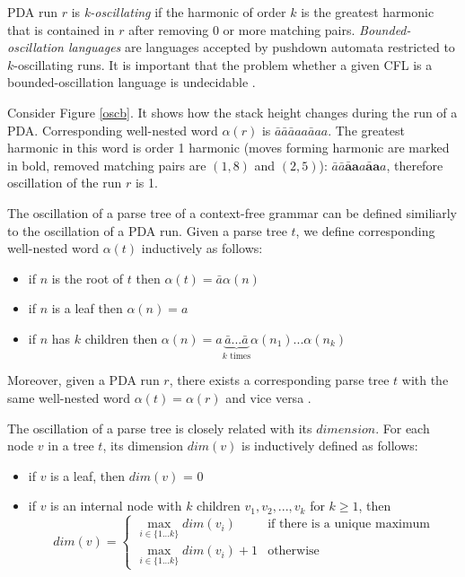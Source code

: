 PDA run $r$ is \textit{k-oscillating} if the harmonic of order $k$ is the greatest harmonic that is contained in $r$ after removing $0$ or more matching pairs. \textit{Bounded-oscillation languages} are languages accepted by pushdown automata restricted to $k$-oscillating runs. It is important that the problem whether a given CFL is a bounded-oscillation language is undecidable \cite{BoundOsc}.
\begin{example}
Consider Figure \ref{oscb}. It shows how the stack height changes during the run of a PDA. Corresponding well-nested word $\alpha(r)$ is $\bar{a}\bar{a}\bar{a}aa\bar{a}aa$. The greatest harmonic in this word is order 1 harmonic (moves forming harmonic are marked in bold, removed matching pairs are $(1, 8)$ and $(2, 5)$): $\bar{a}\bar{a}\mathbf{\bar{a}a}a\mathbf{\bar{a}a}a$, therefore oscillation of the run $r$ is 1.
\end{example}


The oscillation of a parse tree of a context-free grammar can be defined similiarly to the oscillation of a PDA run. Given a parse tree $t$, we define corresponding well-nested word $\alpha(t)$ inductively as follows:
\begin{itemize}
\item if $n$ is the root of $t$ then $\alpha(t) = \bar{a}\alpha(n)$
\item if $n$ is a leaf then $\alpha(n)=a$
\item if $n$ has $k$ children then $\alpha(n) = a\underbrace{\bar{a}...\bar{a}}_\text{$k$ times}\alpha(n_1)...\alpha(n_k)$
\end{itemize}


Moreover, given a PDA run $r$, there exists a corresponding parse tree $t$ with the same well-nested word $\alpha(t)=\alpha(r)$ and vice versa \cite{BoundOsc}.


The oscillation of a parse tree is closely related with its $dimension$. For each node $v$ in a tree $t$, its dimension $dim(v)$ is inductively defined as follows:
\begin{itemize}
\item if $v$ is a leaf, then $dim(v)$ = 0
\item if $v$ is an internal node with $k$ children $v_1, v_2, ..., v_k$ for $k \ge 1$, then 
$$
dim(v) = 
 \begin{cases}
   \max_{i \in \{1...k\}}dim(v_i) &\text{if there is a unique maximum}\\
   \max_{i \in \{1...k\}}dim(v_i)+1 &\text{otherwise}
 \end{cases}
$$
\end{itemize}


